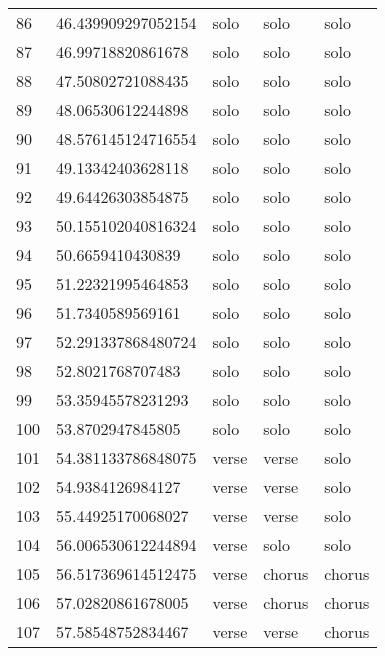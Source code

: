 \begin{table}[]
\begin{tabular}{lllll}
    86   & 46.439909297052154 & solo         & solo            & solo           \\
    87   & 46.99718820861678  & solo         & solo            & solo           \\
    88   & 47.50802721088435  & solo         & solo            & solo           \\
    89   & 48.06530612244898  & solo         & solo            & solo           \\
    90   & 48.576145124716554 & solo         & solo            & solo           \\
    91   & 49.13342403628118  & solo         & solo            & solo           \\
    92   & 49.64426303854875  & solo         & solo            & solo           \\
    93   & 50.155102040816324 & solo         & solo            & solo           \\
    94   & 50.6659410430839   & solo         & solo            & solo           \\
    95   & 51.22321995464853  & solo         & solo            & solo           \\
    96   & 51.7340589569161   & solo         & solo            & solo           \\
    97   & 52.291337868480724 & solo         & solo            & solo           \\
    98   & 52.8021768707483   & solo         & solo            & solo           \\
    99   & 53.35945578231293  & solo         & solo            & solo           \\
    100  & 53.8702947845805   & solo         & solo            & solo           \\
    101  & 54.381133786848075 & verse        & verse           & solo           \\
    102  & 54.9384126984127   & verse        & verse           & solo           \\
    103  & 55.44925170068027  & verse        & verse           & solo           \\
    104  & 56.006530612244894 & verse        & solo            & solo           \\
    105  & 56.517369614512475 & verse        & chorus          & chorus         \\
    106  & 57.02820861678005  & verse        & chorus          & chorus         \\
    107  & 57.58548752834467  & verse        & verse           & chorus         \\

\end{tabular}
\end{table}

